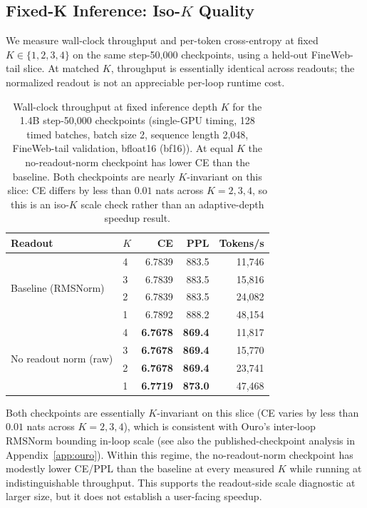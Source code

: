 \subsection{Fixed-K Inference: Iso-\texorpdfstring{$K$}{K} Quality}
\label{sec:fixedk-14b}

We measure wall-clock throughput and per-token cross-entropy at fixed $K \in \{1,2,3,4\}$ on the same step-50{,}000 checkpoints, using a held-out FineWeb-tail slice.
At matched $K$, throughput is essentially identical across readouts; the normalized readout is not an appreciable per-loop runtime cost.

\begin{table}[h]
\centering
\small
\caption{Wall-clock throughput at fixed inference depth $K$ for the 1.4B step-50{,}000 checkpoints (single-GPU timing, 128 timed batches, batch size 2, sequence length 2{,}048, FineWeb-tail validation, bfloat16 (bf16)). At equal $K$ the no-readout-norm checkpoint has lower CE than the baseline. Both checkpoints are nearly $K$-invariant on this slice: CE differs by less than $0.01$ nats across $K{=}2{,}3{,}4$, so this is an iso-$K$ scale check rather than an adaptive-depth speedup result.}
\label{tab:fixedk-14b}
\begin{tabular}{llrrr}
\toprule
\textbf{Readout} & \textbf{$K$} & \textbf{CE} & \textbf{PPL} & \textbf{Tokens/s} \\
\midrule
\multirow{4}{*}{Baseline (RMSNorm)}
 & 4 & 6.7839 & 883.5 & 11{,}746 \\
 & 3 & 6.7839 & 883.5 & 15{,}816 \\
 & 2 & 6.7839 & 883.5 & 24{,}082 \\
 & 1 & 6.7892 & 888.2 & 48{,}154 \\
\midrule
\multirow{4}{*}{No readout norm (raw)}
 & 4 & \textbf{6.7678} & \textbf{869.4} & 11{,}817 \\
 & 3 & \textbf{6.7678} & \textbf{869.4} & 15{,}770 \\
 & 2 & \textbf{6.7678} & \textbf{869.4} & 23{,}741 \\
 & 1 & \textbf{6.7719} & \textbf{873.0} & 47{,}468 \\
\bottomrule
\end{tabular}
\end{table}

Both checkpoints are essentially $K$-invariant on this slice (CE varies by less than $0.01$ nats across $K{=}2{,}3{,}4$), which is consistent with Ouro's inter-loop RMSNorm bounding in-loop scale (see also the published-checkpoint analysis in Appendix~\ref{app:ouro}).
Within this regime, the no-readout-norm checkpoint has modestly lower CE/PPL than the baseline at every measured $K$ while running at indistinguishable throughput.
This supports the readout-side scale diagnostic at larger size, but it does not establish a user-facing speedup.
